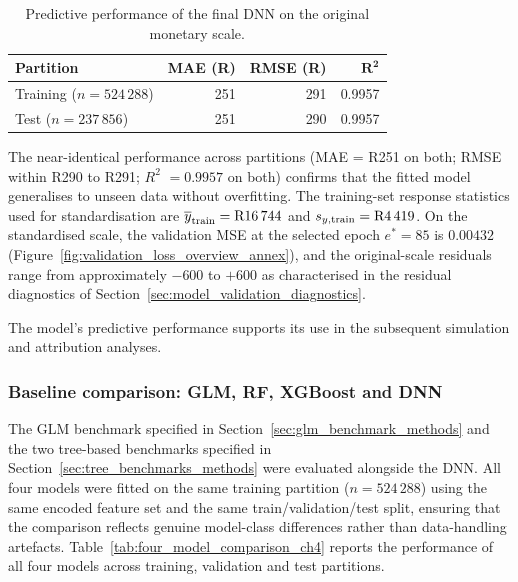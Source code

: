 \begin{table}[H]
\centering
\small
\renewcommand{\arraystretch}{1.15}
\begin{tabular}{lrrr}
\toprule
\textbf{Partition} & \textbf{MAE (R)} & \textbf{RMSE (R)} & $\boldsymbol{R^2}$ \\
\midrule
Training ($n = 524\,288$) & 251 & 291 & 0.9957 \\
Test ($n = 237\,856$) & 251 & 290 & 0.9957 \\
\bottomrule
\end{tabular}
\caption{Predictive performance of the final DNN on the original
monetary scale.}
\label{tab:final_model_performance_ch4}
\end{table}

\noindent
The near-identical performance across partitions (MAE = R251 on both;
RMSE within R290 to R291; \ensuremath{R^2} $= 0.9957$ on both) confirms that the
fitted model generalises to unseen data without overfitting.  The
training-set response statistics used for standardisation are
$\overline{y}_{\mathrm{train}} = \text{R16\,744}$ and
$s_{y,\mathrm{train}} = \text{R4\,419}$.  On the standardised scale,
the validation MSE at the selected epoch $e^{*} = 85$ is $0.00432$
(Figure~\ref{fig:validation_loss_overview_annex}), and the
original-scale residuals range from approximately $-600$ to $+600$ as
characterised in the residual diagnostics of
Section~\ref{sec:model_validation_diagnostics}.

The model's predictive performance supports its use in the
subsequent simulation and attribution analyses.

\subsubsection{Baseline comparison: GLM, RF, XGBoost and DNN}
\label{sec:four_model_comparison_ch4}

The GLM benchmark specified in
Section~\ref{sec:glm_benchmark_methods} and the two tree-based
benchmarks specified in Section~\ref{sec:tree_benchmarks_methods} were
evaluated alongside the DNN.  All four models were fitted on the
same training partition ($n = 524\,288$) using the same encoded feature
set and the same train/validation/test split, ensuring that the
comparison reflects genuine model-class differences rather than
data-handling artefacts.
Table~\ref{tab:four_model_comparison_ch4} reports the
performance of all four models across training, validation and test
partitions.


